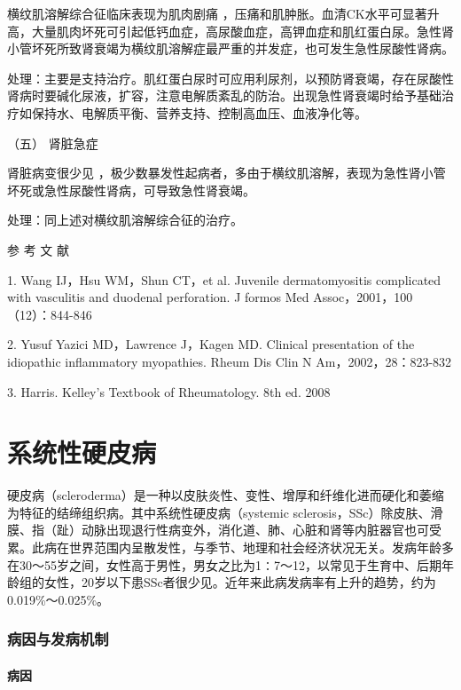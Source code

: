 横纹肌溶解综合征临床表现为肌肉剧痛
，压痛和肌肿胀。血清CK水平可显著升高，大量肌肉坏死可引起低钙血症，高尿酸血症，高钾血症和肌红蛋白尿。急性肾小管坏死所致肾衰竭为横纹肌溶解症最严重的并发症，也可发生急性尿酸性肾病。

处理：主要是支持治疗。肌红蛋白尿时可应用利尿剂，以预防肾衰竭，存在尿酸性肾病时要碱化尿液，扩容，注意电解质紊乱的防治。出现急性肾衰竭时给予基础治疗如保持水、电解质平衡、营养支持、控制高血压、血液净化等。

\hypertarget{text00350.htmlux5cux23CHP14-3-3-4-5}{}
（五） 肾脏急症

肾脏病变很少见
，极少数暴发性起病者，多由于横纹肌溶解，表现为急性肾小管坏死或急性尿酸性肾病，可导致急性肾衰竭。

处理：同上述对横纹肌溶解综合征的治疗。

\protect\hypertarget{text00351.html}{}{}

\hypertarget{text00351.htmlux5cux23CHP14-3-4}{}
参 考 文 献

1. Wang IJ，Hsu WM，Shun CT，et al. Juvenile dermatomyositis complicated
with vasculitis and duodenal perforation. J formos Med
Assoc，2001，100（12）：844-846

2. Yusuf Yazici MD，Lawrence J，Kagen MD. Clinical presentation of the
idiopathic inflammatory myopathies. Rheum Dis Clin N
Am，2002，28：823-832

3. Harris. Kelley's Textbook of Rheumatology. 8th ed. 2008

\protect\hypertarget{text00352.html}{}{}

\chapter{系统性硬皮病}

硬皮病（scleroderma）是一种以皮肤炎性、变性、增厚和纤维化进而硬化和萎缩为特征的结缔组织病。其中系统性硬皮病（systemic
sclerosis，SSc）除皮肤、滑膜、指（趾）动脉出现退行性病变外，消化道、肺、心脏和肾等内脏器官也可受累。此病在世界范围内呈散发性，与季节、地理和社会经济状况无关。发病年龄多在30～55岁之间，女性高于男性，男女之比为1∶7～12，以常见于生育中、后期年龄组的女性，20岁以下患SSc者很少见。近年来此病发病率有上升的趋势，约为0.019\%～0.025\%。

\subsection{病因与发病机制}

\subsubsection{病因}

